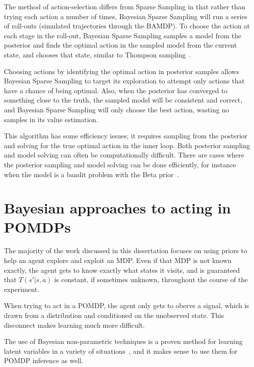 The method of action-selection differs from Sparse Sampling in that rather than trying each action a number of times, Bayesian Sparse Sampling will run a series of roll-outs (simulated trajectories through the BAMDP). To choose the action at each stage in the roll-out, Bayesian Sparse Sampling samples a model from the posterior and finds the optimal action in the sampled model from the current state, and chooses that state, similar to Thompson sampling~\cite{thompson33}.


Choosing actions by identifying the optimal action in posterior samples allows Bayesian Sparse Sampling to target its exploration to attempt only actions that have a chance of being optimal. Also, when the posterior has converged to something close to the truth, the sampled model will be consistent and correct, and Bayesian Sparse Sampling will only choose the best action, wasting no samples in its value estimation.

This algorithm has some efficiency issues; it requires sampling from the posterior and solving for the true optimal action in the inner loop. Both posterior sampling and model solving can often be computationally difficult. There are cases where the posterior sampling and model solving can be done efficiently, for instance when the model is a bandit problem with the Beta prior~\cite{wang05}.


\section{Bayesian approaches to acting in POMDPs}

The majority of the work discussed in this dissertation focuses on using priors to help an agent explore and exploit an MDP. Even if that MDP is not known exactly, the agent gets to know exactly what states it visits, and is guaranteed that $T(s'|s,a)$ is constant, if sometimes unknown, throughout the course of the experiment.

When trying to act in a POMDP, the agent only gets to oberve a signal, which is drawn from a distribution and conditioned on the unobserved state. This disconnect makes learning much more difficult.

The use of Bayesian non-parametric techniques is a proven method for learning latent variables in a variety of situations~\cite{blei2003latent,Blei04hierarchicaltopic,asmuth09}, and it makes sense to use them for POMDP inference as well.


